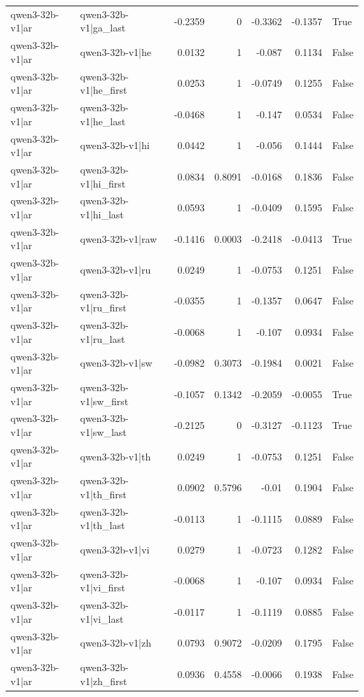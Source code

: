 \begin{table}
\begin{tabular}{l l r r r r l}
qwen3-32b-v1|ar & qwen3-32b-v1|ga_last & -0.2359 & 0 & -0.3362 & -0.1357 & True \\
qwen3-32b-v1|ar & qwen3-32b-v1|he & 0.0132 & 1 & -0.087 & 0.1134 & False \\
qwen3-32b-v1|ar & qwen3-32b-v1|he_first & 0.0253 & 1 & -0.0749 & 0.1255 & False \\
qwen3-32b-v1|ar & qwen3-32b-v1|he_last & -0.0468 & 1 & -0.147 & 0.0534 & False \\
qwen3-32b-v1|ar & qwen3-32b-v1|hi & 0.0442 & 1 & -0.056 & 0.1444 & False \\
qwen3-32b-v1|ar & qwen3-32b-v1|hi_first & 0.0834 & 0.8091 & -0.0168 & 0.1836 & False \\
qwen3-32b-v1|ar & qwen3-32b-v1|hi_last & 0.0593 & 1 & -0.0409 & 0.1595 & False \\
qwen3-32b-v1|ar & qwen3-32b-v1|raw & -0.1416 & 0.0003 & -0.2418 & -0.0413 & True \\
qwen3-32b-v1|ar & qwen3-32b-v1|ru & 0.0249 & 1 & -0.0753 & 0.1251 & False \\
qwen3-32b-v1|ar & qwen3-32b-v1|ru_first & -0.0355 & 1 & -0.1357 & 0.0647 & False \\
qwen3-32b-v1|ar & qwen3-32b-v1|ru_last & -0.0068 & 1 & -0.107 & 0.0934 & False \\
qwen3-32b-v1|ar & qwen3-32b-v1|sw & -0.0982 & 0.3073 & -0.1984 & 0.0021 & False \\
qwen3-32b-v1|ar & qwen3-32b-v1|sw_first & -0.1057 & 0.1342 & -0.2059 & -0.0055 & True \\
qwen3-32b-v1|ar & qwen3-32b-v1|sw_last & -0.2125 & 0 & -0.3127 & -0.1123 & True \\
qwen3-32b-v1|ar & qwen3-32b-v1|th & 0.0249 & 1 & -0.0753 & 0.1251 & False \\
qwen3-32b-v1|ar & qwen3-32b-v1|th_first & 0.0902 & 0.5796 & -0.01 & 0.1904 & False \\
qwen3-32b-v1|ar & qwen3-32b-v1|th_last & -0.0113 & 1 & -0.1115 & 0.0889 & False \\
qwen3-32b-v1|ar & qwen3-32b-v1|vi & 0.0279 & 1 & -0.0723 & 0.1282 & False \\
qwen3-32b-v1|ar & qwen3-32b-v1|vi_first & -0.0068 & 1 & -0.107 & 0.0934 & False \\
qwen3-32b-v1|ar & qwen3-32b-v1|vi_last & -0.0117 & 1 & -0.1119 & 0.0885 & False \\
qwen3-32b-v1|ar & qwen3-32b-v1|zh & 0.0793 & 0.9072 & -0.0209 & 0.1795 & False \\
qwen3-32b-v1|ar & qwen3-32b-v1|zh_first & 0.0936 & 0.4558 & -0.0066 & 0.1938 & False \\

\end{tabular}
\end{table}
